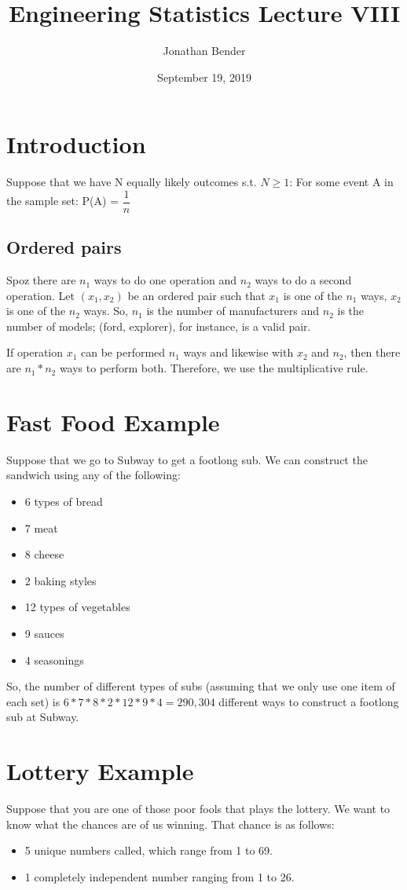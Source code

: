 \documentclass[]{article}
\title{Engineering Statistics Lecture VIII}
\author{Jonathan Bender}
\date{September 19, 2019}
\begin{document}
	
	\maketitle
	
	\begin{abstract}
	\end{abstract}
	
	\section{Introduction}
		Suppose that we have N equally likely outcomes s.t. $N \geq 1$:
		For some event A in the sample set:
		P(A) = $\dfrac{1}{n}$
		
		\subsection{Ordered pairs}
		
			Spoz there are $n_1$ ways to do one operation and $n_2$ ways to do a second operation. Let $(x_1, x_2)$ be an ordered pair such that $x_1$ is one of the $n_1$ ways, $x_2$ is one of the $n_2$ ways. So, $n_1$ is the number of manufacturers and $n_2$ is the number of models; (ford, explorer), for instance, is a valid pair.
			
			If operation $x_1$ can be performed $n_1$ ways and likewise with $x_2$ and $n_2$, then there are $n_1 * n_2$ ways to perform both. Therefore, we use the multiplicative rule.
			
	\section{Fast Food Example}
		Suppose that we go to Subway to get a footlong sub. We can construct the sandwich using any of the following:
		\begin{itemize}
			\item 6 types of bread
			\item 7 meat
			\item 8 cheese
			\item 2 baking styles
			\item 12 types of vegetables
			\item 9 sauces
			\item 4 seasonings
		\end{itemize}
		So, the number of different types of subs (assuming that we only use one item of each set) is $6 * 7 * 8 * 2 * 12 * 9 * 4 = 290,304$ different ways to construct a footlong sub at Subway.
	\section{Lottery Example}
		Suppose that you are one of those poor fools that plays the lottery. We want to know what the chances are of us winning. That chance is as follows:
		\begin{itemize}
			\item 5 unique numbers called, which range from 1 to 69.
			\item 1 completely independent number ranging from 1 to 26.
		\end{itemize}
		
\end{document}
